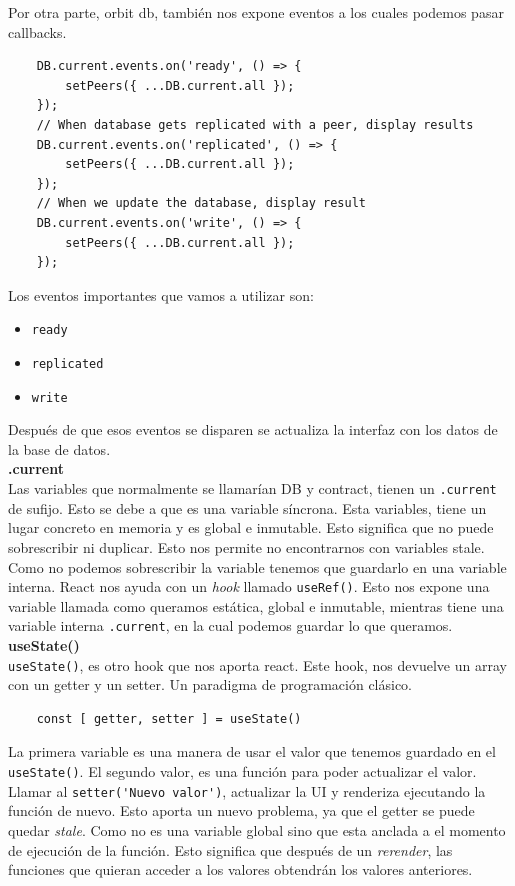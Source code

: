 Por otra parte, orbit db, también nos expone eventos a los cuales podemos pasar callbacks.
\begin{lstlisting}
    DB.current.events.on('ready', () => {
        setPeers({ ...DB.current.all });
    });
    // When database gets replicated with a peer, display results
    DB.current.events.on('replicated', () => {
        setPeers({ ...DB.current.all });
    });
    // When we update the database, display result
    DB.current.events.on('write', () => {
        setPeers({ ...DB.current.all });
    });
\end{lstlisting}
Los eventos importantes que vamos a utilizar son:
\begin{itemize}
    \item \verb|ready|
    \item \verb|replicated|
    \item \verb|write|
\end{itemize}
Después de que esos eventos se disparen se actualiza la interfaz con los datos de la base de datos.\\
\textbf{.current}\\
Las variables que normalmente se llamarían DB y contract, tienen un \verb|.current| de sufijo. Esto se debe a que es una variable síncrona. Esta variables, tiene un lugar concreto en memoria y es global e inmutable.
Esto significa que no puede sobrescribir ni duplicar. Esto nos permite no encontrarnos con variables stale. Como no podemos sobrescribir la variable tenemos que guardarlo en una variable interna.
React nos ayuda con un \textit{hook} llamado \verb|useRef()|. Esto nos expone una variable llamada como queramos estática, global e inmutable, mientras tiene una variable interna \verb|.current|, en la cual podemos guardar lo que queramos.\\
\textbf{useState()}\\
\verb|useState()|, es otro hook que nos aporta react. Este hook, nos devuelve un array con un getter y un setter. Un paradigma de programación clásico.
\begin{lstlisting}
    const [ getter, setter ] = useState()
\end{lstlisting}
La primera variable es una manera de usar el valor que tenemos guardado en el \verb|useState()|. El segundo valor, es una función para poder actualizar el valor. Llamar al \verb|setter('Nuevo valor')|, actualizar la UI y renderiza ejecutando la función de nuevo.
Esto aporta un nuevo problema, ya que el getter se puede quedar \textit{stale}. Como no es una variable global sino que esta anclada a el momento de ejecución de la función. Esto significa que después de un \textit{rerender}, las funciones que quieran acceder a los valores obtendrán los valores anteriores.\\
